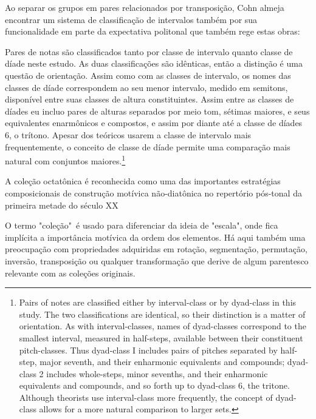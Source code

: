 \documentclass[
	12pt,				%
	openright,			%
	twoside,			%
	a4paper,			%
	english,			%
	french,				%
	spanish,			%
	brazil				%
	]{abntex2}
\begin{document}
Ao separar os grupos em pares relacionados por transposição, Cohn almeja encontrar um sistema de classificação de intervalos também por sua funcionalidade em parte da expectativa politonal que também rege estas obras:

\begin{citacao}
Pares de notas são classificados tanto por classe de intervalo quanto classe de díade neste estudo. As duas classificações são idênticas, então a distinção é uma questão de orientação. Assim como com as classes de intervalo, os nomes das classes de díade correspondem ao seu menor intervalo, medido em semitons, disponível entre suas classes de altura constituintes. Assim entre as classes de díades eu incluo pares de alturas separados por meio tom, sétimas maiores, e seus equivalentes enarmônicos e compostos, e assim por diante até a classe de díades 6, o trítono. Apesar dos teóricos usarem a classe de intervalo mais frequentemente, o conceito de classe de díade permite uma comparação mais natural com conjuntos maiores.\cite[ p.265-266]{cohn1991bartok}\footnote{Pairs of notes are classified either by interval-class or by dyad-class in this study. The two classifications are identical, so their distinction is a matter of orientation. As with interval-classes, names of dyad-classes correspond to the smallest interval, measured in half-steps, available between their constituent pitch-classes. Thus dyad-class I includes pairs of pitches separated by half-step, major seventh, and their enharmonic equivalents and compounds; dyad-class 2 includes whole-steps, minor sevenths, and their enharmonic equivalents and compounds, and so forth up to dyad-class 6, the tritone. Although theorists use interval-class more frequently, the concept of dyad-class allows for a more natural comparison to larger sets.\cite[ p.265-266]{cohn1991bartok}}
\end{citacao}

A coleção octatônica é reconhecida como uma das importantes estratégias composicionais de construção motívica não-diatônica no repertório pós-tonal da primeira metade do século XX \cite{berger1963problems,antokoletz1984music,lester1989analytic,forte1991debussy,straus2004,de2013simetria}

O termo "coleção"\ é usado para diferenciar da ideia de "escala", onde fica implícita a importância motívica da ordem dos elementos. Há aqui também uma preocupação com propriedades adquiridas em rotação, segmentação, permutação, inversão, transposição ou qualquer transformação que derive de algum parentesco relevante com as coleções originais.
\end{document}
